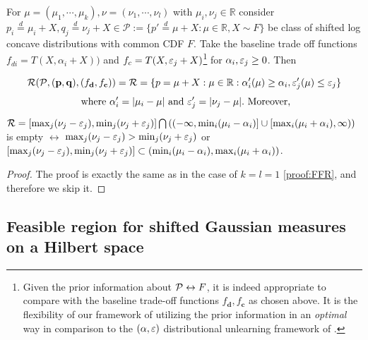 \begin{proposition} \label{prop:FFRLCk}
For $\mu = (\mu_1, \cdots, \mu_k), \nu= (\nu_1, \cdots, \nu_l)$ with $ \mu_i, \nu_j\in \mathbb{R}$ consider  $p_i \overset{d}{=} \mu_i+X , q_j \overset{d}{=} \nu_j+X\in \mathcal{P}:= \{p' \overset{d}{=} \mu+ X: \mu \in \mathbb{R},  X \sim F\}$ be class of shifted log concave distributions with common CDF $F$. Take the baseline trade off functions $f_{di}= T(X,\alpha_i+X))$ and $f_c= T(X, \varepsilon_j +X)$\footnote{Given the prior information about $\mathcal{P} \leftrightarrow F$, it is indeed appropriate to compare with the baseline trade-off functions $f_{\mathbf{d}},f_{\mathbf{c}}$ as chosen above. It is the flexibility of our framework of utilizing the prior information in an \textit{optimal} way in comparison to the $(\alpha, \varepsilon)$ distributional unlearning framework of \cite{allouah2025distributionalmachineunlearningselective}.} for $\alpha_i, \varepsilon_j \geq 0$. Then 

\begin{equation} \label{eq:XFRk}
\mathcal{R}(\mathcal{P}, (\mathbf{p},\mathbf{q}), (f_{\mathbf{d}},f_{\mathbf{c}})) =
\mathcal{R}= \{p= \mu+X: \mu \in \mathbb{R}: \alpha_i'(\mu) \geq \alpha_i, \varepsilon_j'(\mu) \leq \varepsilon_j\} 
\end{equation}
\begin{equation} \label{eq:XFRkparameters0}
\text{ where } \alpha_i'= |\mu_i -\mu|  \text{ and }\varepsilon_j'= |\nu_j -\mu|. \text{ Moreover,}
\end{equation}
  $\mathcal{R}= [\max_{j} (\nu_j -\varepsilon_j), \min_{j} (\nu_j + \varepsilon_j)] \bigcap \left((-\infty, \min_{i}(\mu_i -\alpha_i)] \cup [ \max_{i} (\mu_i+\alpha_i), \infty)\right)$ is empty $\leftrightarrow$ $ \max_{j} (\nu_j -\varepsilon_j) > \min_{j} (\nu_j + \varepsilon_j)$ or $[\max_{j} (\nu_j -\varepsilon_j), \min_{j} (\nu_j + \varepsilon_j)] \subset (\min_{i}(\mu_i -\alpha_i), \max_{i} (\mu_i+\alpha_i))$.
\end{proposition}


\begin{proof}
    The proof is exactly the same as in the case of $k=l=1$ \ref{proof:FFR}, and therefore we skip it.
\end{proof}




\subsection{Feasible region for 
shifted Gaussian measures on a Hilbert space} \label{ssec:GaussiansonHS}

